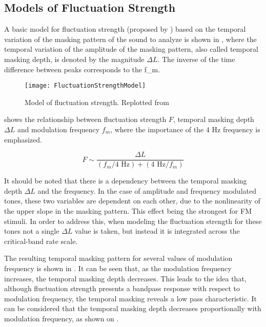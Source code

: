 \documentclass[../main.tex]{subfiles}
\begin{document}
\begin{theoreticalbackground}
\subsection{Models of Fluctuation Strength}

A basic model for fluctuation strength (proposed by
\textcite[pp.~254]{Fastl2007Psychoacoustics}) based on the temporal variation of
the masking pattern of the sound to analyze is shown in
, where the temporal variation of the amplitude of the
masking pattern, also called temporal masking depth, is denoted by the magnitude
$\Delta L$. The inverse of the time difference between peaks corresponds to the
\gls{f_m}.

\begin{figure}[!ht]
  \centering
  \texttt{[image: FluctuationStrengthModel]}
  \caption{Model of fluctuation strength. Replotted from
  \cite[pp. 254]{Fastl2007Psychoacoustics}}
\label{fig:flucstrenmodel}
\end{figure}

 shows the relationship between fluctuation
strength $F$, temporal masking depth $\Delta L$ and modulation frequency
$f_{m}$, where the importance of the 4 Hz frequency is emphasized.

\begin{equation}
  F \sim \frac{\Delta L}{(f_{m}/4\text{ Hz}) + (4\text{ Hz}/f_{m})}
  \label{eq:flucstrentempmaskmodfreq}
\end{equation}

It should be noted that there is a dependency between the temporal masking depth
$\Delta L$ and the frequency. In the case of amplitude and frequency modulated
tones, these two variables are dependent on each other, due to the nonlinearity
of the upper slope in the masking pattern. This effect being the strongest for
\gls{FM} stimuli. In order to address this, when modeling the fluctuation
strength for these tones not a single $\Delta L$ value is taken, but instead it
is integrated across the critical-band rate scale.

The resulting temporal masking pattern for several values of modulation
frequency is shown in . It can be seen that, as the
modulation frequency increases, the temporal masking depth decreases. This leads
to the idea that, although fluctuation strength presents a bandpass response
with respect to modulation frequency, the temporal masking reveals a low pass
characteristic. It can be considered that the temporal masking depth decreases
proportionally with modulation frequency, as shown on
.


\end{theoreticalbackground}
\end{document}
